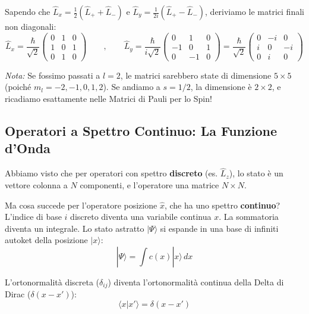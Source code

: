 \documentclass[11pt, a4paper]{article}
\begin{document}
\noindent
Sapendo che $\hat{L}_x = \frac{1}{2}(\hat{L}_+ + \hat{L}_-)$ e $\hat{L}_y = \frac{1}{2i}(\hat{L}_+ - \hat{L}_-)$, deriviamo le matrici finali non diagonali: %
\begin{equation}
    \boxed{ \hat{L}_x = \frac{\hbar}{\sqrt{2}} \begin{pmatrix} 0 & 1 & 0 \\ 1 & 0 & 1 \\ 0 & 1 & 0 \end{pmatrix} } \qquad , \qquad \boxed{ \hat{L}_y = \frac{\hbar}{i\sqrt{2}} \begin{pmatrix} 0 & 1 & 0 \\ -1 & 0 & 1 \\ 0 & -1 & 0 \end{pmatrix} = \frac{\hbar}{\sqrt{2}} \begin{pmatrix} 0 & -i & 0 \\ i & 0 & -i \\ 0 & i & 0 \end{pmatrix} } %
\end{equation}

\noindent
\textit{Nota:} Se fossimo passati a $l=2$, le matrici sarebbero state di dimensione $5 \times 5$ (poiché $m_l = -2, -1, 0, 1, 2$). Se andiamo a $s=1/2$, la dimensione è $2 \times 2$, e ricadiamo esattamente nelle Matrici di Pauli per lo Spin! %

\subsection{Operatori a Spettro Continuo: La Funzione d'Onda} %

Abbiamo visto che per operatori con spettro \textbf{discreto} (es. $\hat{L}_z$), lo stato è un vettore colonna a $N$ componenti, e l'operatore una matrice $N \times N$. %

\noindent
Ma cosa succede per l'operatore posizione $\hat{x}$, che ha uno spettro \textbf{continuo}? %
L'indice di base $i$ discreto diventa una variabile continua $x$. La sommatoria diventa un integrale. Lo stato astratto $|\Psi\rangle$ si espande in una base di infiniti autoket della posizione $|x\rangle$: %
\begin{equation*}
    |\Psi\rangle = \int c(x) |x\rangle \, dx %
\end{equation*}

\noindent
L'ortonormalità discreta ($\delta_{ij}$) diventa l'ortonormalità continua della Delta di Dirac ($\delta(x-x')$): %
\begin{equation*}
    \langle x | x' \rangle = \delta(x-x') %
\end{equation*}
\end{document}
